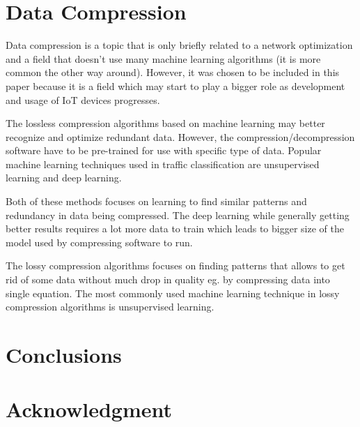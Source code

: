 \documentclass[conference]{IEEEtran}
\begin{document}
\section{Data Compression}
Data compression is a topic that is only briefly related to a network optimization and a field that doesn't use many machine learning algorithms (it is more common the other way around\cite{compression3}). However, it was chosen to be included in this paper because it is a field which may start to play a bigger role as development and usage of IoT devices progresses\cite{compression2}.\par
The lossless compression algorithms based on machine learning may better recognize and optimize redundant data. However, the compression/decompression software have to be pre-trained for use with specific type of data. Popular machine learning techniques used in traffic classification are unsupervised learning and deep learning\cite{compression1}\cite{compression4}.\par
Both of these methods focuses on learning to find similar patterns and redundancy in data being compressed. The deep learning while generally getting better results requires a lot more data to train which leads to bigger size of the model used by compressing software to run\cite{compression4}.\par
The lossy compression algorithms focuses on finding patterns that allows to get rid of some data without much drop in quality eg. by compressing data into single equation. The most commonly used machine learning technique in lossy compression algorithms is unsupervised learning\cite{compression2}.

\section{Conclusions}



\section*{Acknowledgment}



\end{document}
